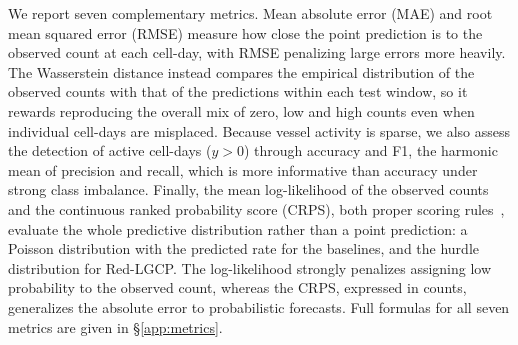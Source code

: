 We report seven complementary metrics. Mean absolute error (MAE) and root mean squared error (RMSE) measure how close the point prediction is to the observed count at each cell-day, with RMSE penalizing large errors more heavily. The Wasserstein distance instead compares the empirical distribution of the observed counts with that of the predictions within each test window, so it rewards reproducing the overall mix of zero, low and high counts even when individual cell-days are misplaced. Because vessel activity is sparse, we also assess the detection of active cell-days ($y>0$) through accuracy and F1, the harmonic mean of precision and recall, which is more informative than accuracy under strong class imbalance. Finally, the mean log-likelihood of the observed counts and the continuous ranked probability score (CRPS), both proper scoring rules~\citep{gneiting2007strictly}, evaluate the whole predictive distribution rather than a point prediction: a Poisson distribution with the predicted rate for the baselines, and the hurdle distribution for Red-LGCP. The log-likelihood strongly penalizes assigning low probability to the observed count, whereas the CRPS, expressed in counts, generalizes the absolute error to probabilistic forecasts. Full formulas for all seven metrics are given in \S\ref{app:metrics}.
